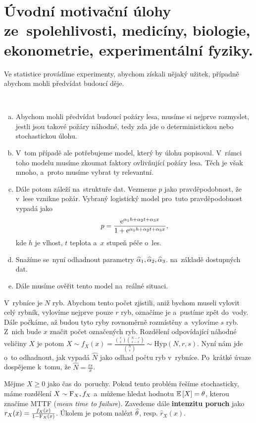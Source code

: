 \chapter{Úvodní motivační úlohy ze~spolehlivosti, medicíny, biologie, ekonometrie, experimentální fyziky.}
Ve statistice provádíme experimenty, abychom získali nějaký užitek, případně abychom mohli předvídat budoucí děje. 

\begin{example}~
	 \begin{enumerate}[a)]
		\item Abychom mohli předvídat budoucí požáry lesa, musíme si nejprve rozmyslet, jestli jsou takové požáry náhodné, tedy zda jde o deterministickou nebo stochastickou úlohu. 
		\item V~tom případě ale potřebujeme model, který by úlohu popisoval. V~rámci toho modelu musíme zkoumat faktory ovlivňující požáry lesa. Těch je však mnoho, a~proto musíme vybrat ty relevantní. 
		\item Dále potom záleží na~struktuře dat. Vezmeme $p$ jako pravděpodobnost, že v~lese vznikne požár. Vybraný logistický model pro~tuto pravděpodobnost vypadá jako
		$$ p=\frac{\mathrm{e}^{\alpha_1 h+\alpha_2t+\alpha_3x}}{1+\mathrm{e}^{\alpha_1 h+\alpha_2 t+\alpha_3 x}}, $$
		kde $h$ je vlhost, $t$ teplota a~$x$ stupeň péče o~les.
		\item Snažíme se~nyní odhadnout parametry $\widehat{\alpha}_1,\widehat{\alpha}_2,\widehat{\alpha}_3$. na~základě dostupných dat.
		\item Dále musíme ověřit tento model na~reálné situaci.
	\end{enumerate} 
\end{example}
\begin{example} V~rybníce je $N$ ryb. Abychom tento počet zjistili, aniž bychom museli vylovit celý rybník, vylovíme nejprve pouze $r$ ryb, označíme je a~pustíme zpět do~vody. Dále počkáme, až budou tyto ryby rovnoměrně rozmístěny a~vylovíme $s$ ryb. Z~nich bude $x$ značit počet označených ryb. Rozdělení odpovídající náhodné veličiny $X$ je potom $X\sim f_X(x)=\frac{\binom{r}{x}\binom{N-r}{s-x}}{\binom{N}{s}}\sim\mathrm{Hyp}(N,r,s)$. Nyní nám jde o~to odhadnout, jak vypadá $\widehat{N}$ jako odhad počtu ryb v~rybníce. Po~krátké úvaze dospějeme k~tomu, že $\widehat{N}=\frac{rs}{x}$.
\end{example}
\begin{example}
	Mějme $X\geq0$ jako čas do~poruchy. Pokud tento problém řešíme stochasticky, máme rozdělení $X\sim \mathrm{F}_X,f_X$ a~můžeme hledat hodnotu $\mathbb{E}\left[ X \right]=\theta$, kterou značíme MTTF (\textit{mean time to failure}). Zavedeme dále \textbf{intenzitu poruch} jako $r_X(x)=\frac{f_X(x)}{1-\mathrm{F}_X(x)}$. Úkolem je potom nalézt $\widehat{\theta}$, resp. $\widehat{r}_X(x)$.
\end{example}
